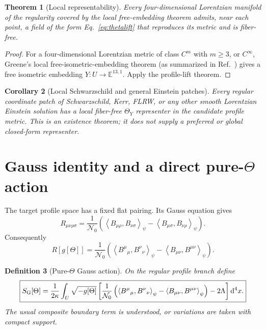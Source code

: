 \documentclass[11pt,a4paper]{article}
\newtheorem{definition}{Definition}[section]
\newtheorem{theorem}[definition]{Theorem}
\newtheorem{corollary}[definition]{Corollary}
\theoremstyle{remark}
\newcommand{\Nzero}{\mathcal N_0}
\newcommand{\avg}[1]{\left\langle #1\right\rangle_\psi}
\newcommand{\dd}{\mathrm d}
\begin{document}
\begin{theorem}[Local representability]
Every four-dimensional Lorentzian manifold of the regularity covered by the
local free-embedding theorem admits, near each point, a field of the form
Eq.~\eqref{eq:thetalift} that reproduces its metric and is fiber-free.
\end{theorem}

\begin{proof}
For a four-dimensional Lorentzian metric of class $C^m$ with $m\ge3$, or
$C^\infty$, Greene's local free-isometric-embedding theorem (as summarized in
Ref.~\cite{Willison2013}) gives a free isometric embedding
$Y:U\to\mathbb E^{13,1}$.  Apply the profile-lift theorem.
\end{proof}

\begin{corollary}[Local Schwarzschild and general Einstein patches]
Every regular coordinate patch of Schwarzschild, Kerr, FLRW, or any other
smooth Lorentzian Einstein solution has a local fiber-free $\Theta_Y$
representer in the candidate profile metric.  This is an existence theorem;
it does not supply a preferred or global closed-form representer.
\end{corollary}

\section{Gauss identity and a direct pure-$\Theta$ action}

The target profile space has a fixed flat pairing.  Its Gauss equation gives
\begin{equation}
 R_{\mu\nu\rho\sigma}
 =\frac1{\Nzero}\left(
   \avg{B_{\mu\rho},B_{\nu\sigma}}
  -\avg{B_{\mu\sigma},B_{\nu\rho}}
 \right).
 \label{eq:Gauss}
\end{equation}
Consequently
\begin{equation}
 R[g[\Theta]]
 =\frac1{\Nzero}\left(
  \avg{B^\mu{}_{\mu},B^\nu{}_{\nu}}
  -\avg{B_{\mu\nu},B^{\mu\nu}}
 \right).
 \label{eq:scalarGauss}
\end{equation}

\begin{definition}[Pure-$\Theta$ Gauss action]
On the regular profile branch define
\begin{equation}
 \boxed{
 S_{\rm G}[\Theta]
 =\frac1{2\kappa}\int_U\sqrt{-g[\Theta]}\left[
 \frac1{\Nzero}\left(
  \avg{B^\mu{}_{\mu},B^\nu{}_{\nu}}
  -\avg{B_{\mu\nu},B^{\mu\nu}}
 \right)-2\Lambda\right]\dd^4x .}
 \label{eq:Gaussaction}
\end{equation}
The usual composite boundary term is understood, or variations are taken with
compact support.
\end{definition}
\end{document}

